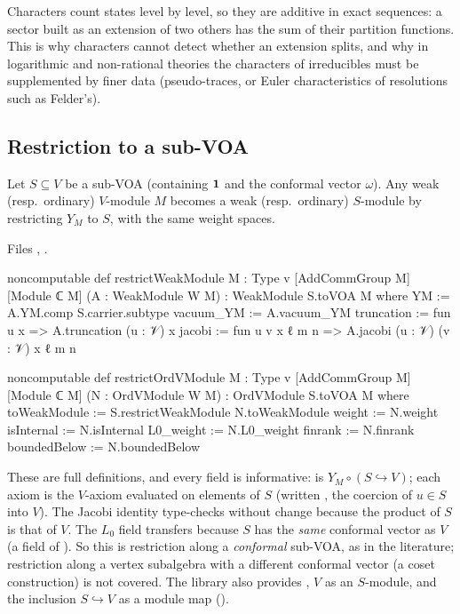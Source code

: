 \begin{physics}
Characters count states level by level, so they are additive in exact sequences: a sector built as an extension
of two others has the sum of their partition functions. This is why characters cannot detect whether an
extension splits, and why in logarithmic and non-rational theories the characters of irreducibles must be
supplemented by finer data (pseudo-traces, or Euler characteristics of resolutions such as Felder's).
\end{physics}

\subsection{Restriction to a sub-VOA}

\begin{definition}\label{l12:def:restrict}
Let $S\subseteq V$ be a sub-VOA (containing $\mathbf{1}$ and the conformal vector $\omega$). Any weak
(resp.\ ordinary) $V$-module $M$ becomes a weak (resp.\ ordinary) $S$-module by restricting $Y_M$ to $S$,
with the same weight spaces.
\end{definition}
\noindent Files ,
.
\begin{leancode}
noncomputable def restrictWeakModule {M : Type v} [AddCommGroup M] [Module ℂ M]
    (A : WeakModule W M) : WeakModule S.toVOA M where
  YM := A.YM.comp S.carrier.subtype
  vacuum_YM := A.vacuum_YM
  truncation := fun u x => A.truncation (u : 𝒱) x
  jacobi := fun u v x ℓ m n => A.jacobi (u : 𝒱) (v : 𝒱) x ℓ m n

noncomputable def restrictOrdVModule {M : Type v} [AddCommGroup M] [Module ℂ M]
    (N : OrdVModule W M) : OrdVModule S.toVOA M where
  toWeakModule := S.restrictWeakModule N.toWeakModule
  weight := N.weight
  isInternal := N.isInternal
  L0_weight := N.L0_weight
  finrank := N.finrank
  boundedBelow := N.boundedBelow
\end{leancode}

\begin{dictionary}
These are full definitions, and every field is informative:  is
$Y_M\circ(S\hookrightarrow V)$; each axiom is the $V$-axiom evaluated on elements of $S$ (written
, the coercion of $u\in S$ into $V$). The Jacobi identity type-checks without change because the
product of $S$ is that of $V$. The $L_0$ field transfers because $S$ has the \emph{same} conformal vector as $V$
(a field of ). So this is restriction along a \emph{conformal} sub-VOA, as in the
literature; restriction along a vertex subalgebra with a different conformal vector (a coset construction) is
not covered. The library also provides , $V$ as an $S$-module, and the inclusion
$S\hookrightarrow V$ as a module map ().
\end{dictionary}

